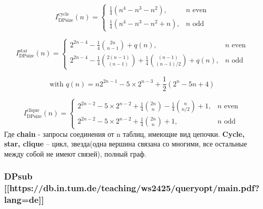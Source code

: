 \documentclass[12pt]{article}
\begin{document}
\begin{flushleft}
\[
I^{\text{cycle}}_{\text{DPsize}}(n) =
\begin{cases}
    \frac{1}{4} (n^4 - n^3 - n^2), & n \text{ even} \\
    \frac{1}{4} (n^4 - n^3 - n^2 + n), & n \text{ odd}
\end{cases}
\]

\[
I^{\text{star}}_{\text{DPsize}}(n) =
\begin{cases}
    2^{2n-4} - \frac{1}{4} \binom{2n}{n-1} + q(n), & n \text{ even} \\
    2^{2n-4} - \frac{1}{4} \binom{2(n-1)}{(n-1)} + \frac{1}{4} \binom{(n-1)}{(n-1)/2} + q(n), & n \text{ odd}
\end{cases}
\]

\[
\text{with } q(n) = n 2^{2n-1} - 5 \times 2^{n-3} + \frac{1}{2} (2^n - 5n + 4)
\]

\[
I^{\text{clique}}_{\text{DPsize}}(n) =
\begin{cases}
    2^{2n-2} - 5 \times 2^{n-2} + \frac{1}{4} \binom{2n}{n} - \frac{1}{4} \binom{n}{n/2} + 1, & n \text{ even} \\
    2^{2n-2} - 5 \times 2^{n-2} + \frac{1}{4} \binom{2n}{n} + 1, & n \text{ odd}
\end{cases}
\]
Где \textbf{chain} - запросы соединения от n таблиц, имеющие вид цепочки. 
\textbf{Cycle, star, clique} -- цикл, звезда(одна вершина связана со многими, все остальные
между собой не имеют связей), полный граф.

\centering \subsubsection*{DPsub [[https://db.in.tum.de/teaching/ws2425/queryopt/main.pdf?lang=de]]} 
\raggedright

\end{flushleft}
\end{document}
